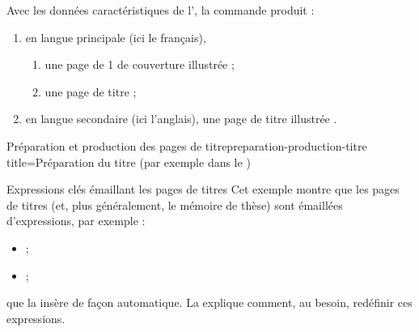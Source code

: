 Avec les données caractéristiques de l',
la commande  produit :
\begin{enumerate}
\item en langue principale (ici le français),
  \begin{enumerate}
  \item {}%
    une page de 1\iere{} de couverture illustrée
     ;
  \item une page de titre ;
  \end{enumerate}
\item en langue secondaire (ici l'anglais), une page de titre illustrée
  .
\end{enumerate}
%
\begin{dbexample}[float]{Préparation et production des pages de titre}{preparation-production-titre}
%
  \NoAutoSpacing%
  {title=Préparation du titre (par exemple dans le \File{\characteristicsfile})}
\end{dbexample}
%
\begin{dbremark}{Expressions clés émaillant les pages de titres}{}
  Cet exemple montre que les pages de titres (et, plus généralement, le mémoire
  de thèse) sont émaillées d'expressions, par exemple :
  \begin{itemize}
  \item {} ;
  \item {} ;
  \end{itemize}
  que la \yatCl{} insère de façon automatique. La 
  explique comment, au besoin, redéfinir ces expressions.
\end{dbremark}

